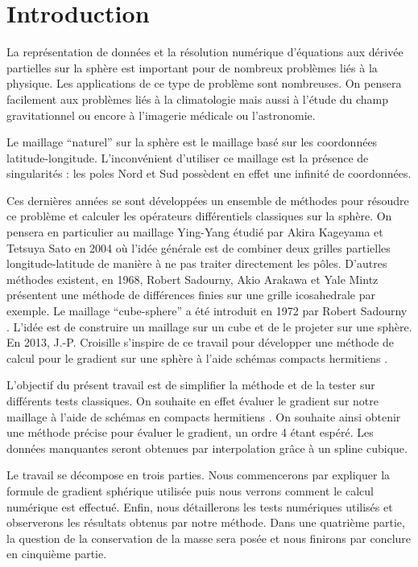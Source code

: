 \section{Introduction}

La représentation de données et la résolution numérique d'équations aux dérivée partielles sur la sphère est important pour de nombreux problèmes liés à la physique. Les applications de ce type de problème sont nombreuses. On pensera facilement aux problèmes liés à la climatologie mais aussi à l'étude du champ gravitationnel ou encore à l'imagerie médicale ou l'astronomie.

Le maillage ``naturel'' sur la sphère est le maillage basé sur les coordonnées latitude-longitude. L'inconvénient d'utiliser ce maillage est la présence de singularités : les poles Nord et Sud possèdent en effet une infinité de coordonnées.

Ces dernières années se sont développées un ensemble de méthodes pour résoudre ce problème et calculer les opérateurs différentiels classiques sur la sphère. On pensera en particulier au maillage Ying-Yang étudié par Akira Kageyama et Tetsuya Sato en 2004 \cite{Kageyama2004} où l'idée générale est de combiner deux grilles partielles longitude-latitude de manière à ne pas traiter directement les p\^oles. D'autres méthodes existent, en 1968, Robert Sadourny, Akio Arakawa et Yale Mintz présentent une méthode de différences finies sur une grille icosahedrale \cite{Sadourny1968} par exemple.
Le maillage ``cube-sphere'' a été introduit en 1972 par Robert Sadourny \cite{Sadourny1972}. L'idée est de construire un maillage sur un cube et de le projeter sur une sphère. En 2013, J.-P. Croisille s'inspire de ce travail pour développer une méthode de calcul pour le gradient sur une sphère à l'aide schémas compacts hermitiens \cite{Croisille2013}.

L'objectif du présent travail est de simplifier la méthode \cite{Croisille2013} et de la tester sur différents tests classiques. On souhaite en effet évaluer le gradient sur notre maillage à l'aide de schémas en compacts hermitiens \cite{Lele1992}. On souhaite ainsi obtenir une méthode  précise pour évaluer le gradient, un ordre 4 étant espéré. Les données manquantes seront obtenues par interpolation gr\^ace à un spline cubique. 

Le travail se décompose en trois parties. Nous commencerons par expliquer la formule de gradient sphérique utilisée puis nous verrons comment le calcul numérique est effectué. Enfin, nous détaillerons les tests numériques utilisés et observerons les résultats obtenus par notre méthode. Dans une quatrième partie, la question de la conservation de la masse sera posée et nous finirons par conclure en cinquième partie.
